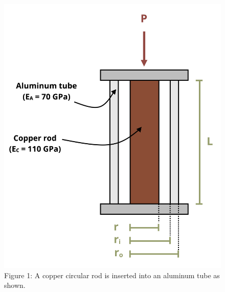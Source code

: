 \documentclass[
  letterpaper,
  DIV=11,
  numbers=noendperiod]{scrreprt}
\begin{document}
\begin{figure}[H]

{\centering \includegraphics{images/192.png}

}

\caption{Figure 1: A copper circular rod is inserted into an aluminum
tube as shown.}

\end{figure}%
\end{document}
